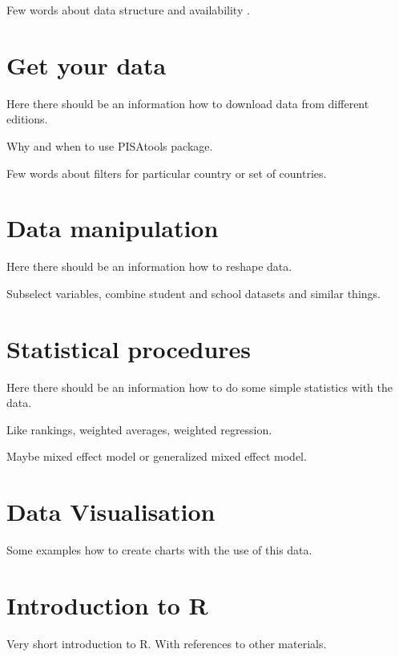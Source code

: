 \documentclass{tufte-book}
\begin{document}
Few words about data structure and availability \cite{PISAwebsite}.

\chapter{Get your data}
Here there should be an information how to download data from different editions.

Why and when to use PISAtools package.

Few words about filters for particular country or set of countries.

\chapter{Data manipulation}
Here there should be an information how to reshape data.

Subselect variables, combine student and school datasets and similar things.

\chapter{Statistical procedures}
Here there should be an information how to do some simple statistics with the data.

Like rankings, weighted averages, weighted regression.

Maybe mixed effect model or generalized mixed effect model.

\chapter{Data Visualisation}

Some examples how to create charts with the use of this data. 

\backmatter

\chapter{Introduction to R}
Very short introduction to R. With references to other materials.




\printindex
\end{document}

